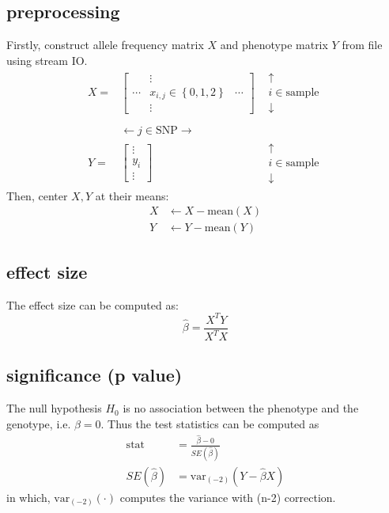\documentclass{article}
\begin{document}
\subsection{preprocessing}
Firstly, construct allele frequency matrix $X$ and phenotype matrix $Y$ from file using stream IO.
$$
\begin{matrix}X=&\left[ \begin{matrix}&\vdots &\\ \cdots &x_{i,j}\in \left\{ 0,1,2\right\}  &\cdots \\ &\vdots &\end{matrix} \right]  &\begin{gathered}\uparrow \\ i\in \text{sample} \\ \downarrow \end{gathered} \\ &&\\ &\leftarrow j\in \text{SNP} \rightarrow &\\ Y=&\left[ \begin{gathered}\vdots \\ y_{i}\\ \vdots \end{gathered} \right]  &\begin{gathered}\uparrow \\ i\in \text{sample} \\ \downarrow \end{gathered} \end{matrix}
$$
Then, center $X, Y$ at their means:
$$
\begin{aligned}X&\leftarrow X-\text{mean} \left( X\right)  \\ Y&\leftarrow Y-\text{mean} \left( Y\right)  \end{aligned} 
$$

\subsection{effect size}
The effect size can be computed as:
$$
\hat{\beta} =\frac{X^{T}Y}{X^{T}X} 
$$

\subsection{significance (p value)}
The null hypothesis $H_0$ is no association between the phenotype and the genotype,
i.e. $\beta = 0$.
Thus the test statistics can be computed as
$$
\begin{aligned}
\text{stat} &=\frac{\hat{\beta } -0}{SE\left( \hat{\beta } \right)  } \\ 
SE\left( \hat{\beta } \right)  &=\text{var}_{(-2)} (Y-\hat{\beta} X)
\end{aligned}
$$
in which, $\text{var}_{(-2)}(\cdot)$ computes the variance with (n-2) correction.
\end{document}

